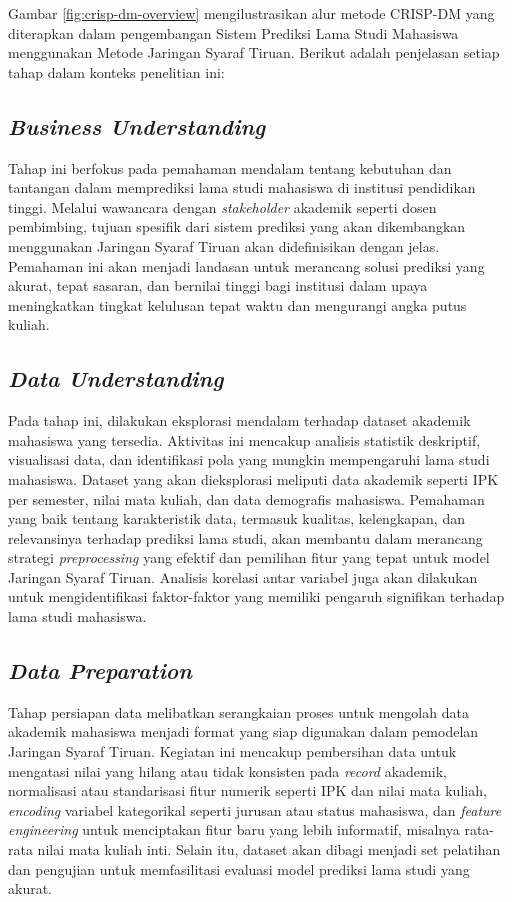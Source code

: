 Gambar \ref{fig:crisp-dm-overview} mengilustrasikan alur metode CRISP-DM yang diterapkan dalam pengembangan Sistem Prediksi Lama Studi Mahasiswa menggunakan Metode Jaringan Syaraf Tiruan. Berikut adalah penjelasan setiap tahap dalam konteks penelitian ini:

\subsection{\textit{Business Understanding}}
Tahap ini berfokus pada pemahaman mendalam tentang kebutuhan dan tantangan dalam memprediksi lama studi mahasiswa di institusi pendidikan tinggi. Melalui wawancara dengan \textit{stakeholder} akademik seperti dosen pembimbing, tujuan spesifik dari sistem prediksi yang akan dikembangkan menggunakan Jaringan Syaraf Tiruan akan didefinisikan dengan jelas. Pemahaman ini akan menjadi landasan untuk merancang solusi prediksi yang akurat, tepat sasaran, dan bernilai tinggi bagi institusi dalam upaya meningkatkan tingkat kelulusan tepat waktu dan mengurangi angka putus kuliah.

\subsection{\textit{Data Understanding}}
Pada tahap ini, dilakukan eksplorasi mendalam terhadap dataset akademik mahasiswa yang tersedia. Aktivitas ini mencakup analisis statistik deskriptif, visualisasi data, dan identifikasi pola yang mungkin mempengaruhi lama studi mahasiswa. Dataset yang akan dieksplorasi meliputi data akademik seperti IPK per semester, nilai mata kuliah, dan data demografis mahasiswa. Pemahaman yang baik tentang karakteristik data, termasuk kualitas, kelengkapan, dan relevansinya terhadap prediksi lama studi, akan membantu dalam merancang strategi \textit{preprocessing} yang efektif dan pemilihan fitur yang tepat untuk model Jaringan Syaraf Tiruan. Analisis korelasi antar variabel juga akan dilakukan untuk mengidentifikasi faktor-faktor yang memiliki pengaruh signifikan terhadap lama studi mahasiswa.

\subsection{\textit{Data Preparation}}
Tahap persiapan data melibatkan serangkaian proses untuk mengolah data akademik mahasiswa menjadi format yang siap digunakan dalam pemodelan Jaringan Syaraf Tiruan. Kegiatan ini mencakup pembersihan data untuk mengatasi nilai yang hilang atau tidak konsisten pada \textit{record} akademik, normalisasi atau standarisasi fitur numerik seperti IPK dan nilai mata kuliah, \textit{encoding} variabel kategorikal seperti jurusan atau status mahasiswa, dan \textit{feature engineering} untuk menciptakan fitur baru yang lebih informatif, misalnya rata-rata nilai mata kuliah inti. Selain itu, dataset akan dibagi menjadi set pelatihan dan pengujian untuk memfasilitasi evaluasi model prediksi lama studi yang akurat.

